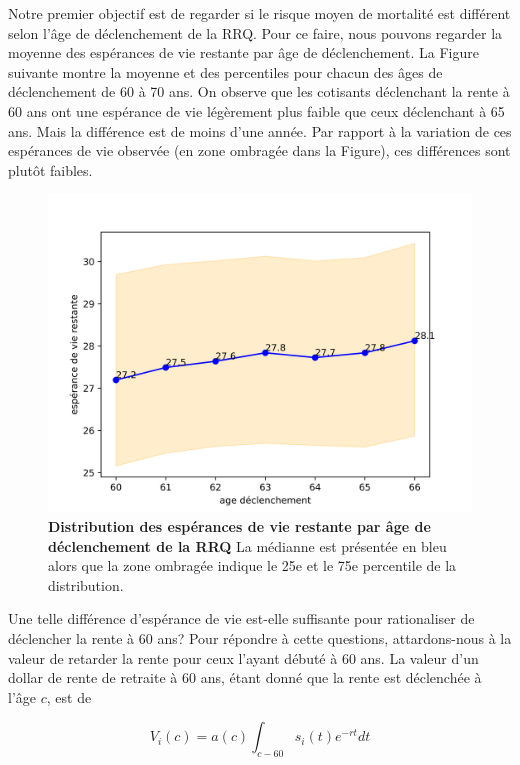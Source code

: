 \documentclass[french, 12pt]{article}
\begin{document}
	
	Notre premier objectif est de regarder si le risque moyen de mortalité est différent selon l'âge de déclenchement de la RRQ. Pour ce faire, nous pouvons regarder la moyenne des espérances de vie restante par âge de déclenchement. La Figure suivante montre la moyenne et des percentiles pour chacun des âges de déclenchement de 60 à 70 ans. On observe que les cotisants déclenchant la rente à 60 ans ont une espérance de vie légèrement plus faible que ceux déclenchant à 65 ans. Mais la différence est de moins d'une année. Par rapport à la variation de ces espérances de vie observée (en zone ombragée dans la Figure), ces différences sont plutôt faibles. 
	
	\begin{figure}[!htbp]
	\centering 
	\includegraphics[scale=0.75]{../figures/ages.png}
	\caption{\textbf{Distribution des espérances de vie restante par âge de déclenchement de la RRQ} La médianne est présentée en bleu alors que la zone ombragée indique le 25e et le 75e percentile de la distribution.}
	\label{fig:ages}
\end{figure}
	
		
Une telle différence d'espérance de vie est-elle suffisante pour rationaliser de déclencher la rente à 60 ans? Pour répondre à cette questions,  attardons-nous à la valeur de retarder la rente pour ceux l'ayant débuté à 60 ans. La valeur d'un dollar de rente de retraite à 60 ans, étant donné que la rente est déclenchée à l'âge $c$, est de 
	
	$$ V_i(c) = a(c)\int_{c-60} s_{i}(t)e^{-rt}dt$$
	
\end{document}
